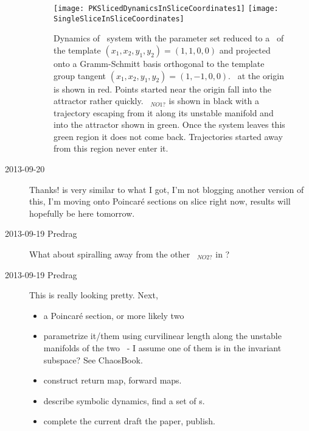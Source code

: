 \begin{description}
\begin{figure}%
  \begin{center}
  \texttt{[image: PKSlicedDynamicsInSliceCoordinates1]}
  \texttt{[image: SingleSliceInSliceCoordinates]}
  \end{center}
  \caption{
    Dynamics of \twoMode\ system with the parameter set
     reduced to a \slicePlane\ of the template
 	$(x_1, x_2, y_1, y_2) =  (1, 1, 0, 0)$ and projected onto a Gramm-Schmitt
 	basis orthogonal to the template group tangent $(x_1, x_2, y_1, y_2) =
 	(1, -1, 0, 0)$. \Reqv\ at the origin is shown in red. Points started near
 	the origin fall into the attractor rather quickly. \Reqv\ ${}_{NO1?}$ is
 	shown in black with a trajectory escaping from it along its unstable manifold
 	and into the attractor shown in green. Once the system leaves this green region
 	it does not come back. Trajectories started away from this region never enter it.
 }
  \label{fig:DBSingleSliceReducedDynamics}
\end{figure}

\item[2013-09-20] Thanks!  is very similar to what I got, I'm not
blogging another version of this, I'm moving onto Poincar\'e sections on slice right now, results will hopefully
be here tomorrow.

\item[2013-09-19 Predrag] What about spiralling away from the other \reqv\ ${}_{NO2?}$
in ?

\item[2013-09-19 Predrag] This is really looking pretty. Next,
\begin{itemize}
  \item a Poincar\'e section, or more likely two
  \item parametrize it/them using curvilinear length along the
  unstable manifolds of the two \reqva\ - I assume one of them is in
  the invariant subspace?
   {See ChaosBook}.
  \item construct return map, forward maps.
  \item describe symbolic dynamics, find a set of \rpo s.
  \item complete the current draft the paper, publish.
\end{itemize}


\end{description}
